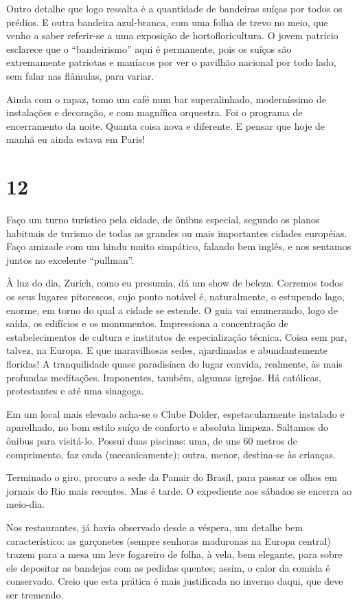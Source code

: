 Outro detalhe que logo ressalta é a quantidade de bandeiras suíças por todos os prédios. E outra bandeira azul-branca, com uma folha de trevo no meio, que venho a saber referir-se a uma exposição de hortofloricultura. O jovem patrício esclarece que o ``bandeirismo'' aqui é permanente, pois os suíços são extremamente patriotas e maníacos por ver o pavilhão nacional por todo lado, sem falar nas flâmulas, para variar.

Ainda com o rapaz, tomo um café num bar superalinhado, moderníssimo de instalações e decoração, e com magnífica orquestra. Foi o programa de encerramento da noite. Quanta coisa nova e diferente. E pensar que hoje de manhã eu ainda estava em Paris!

\section*{12 \adfflatleafright {}}
Faço um turno turístico pela cidade, de ônibus especial, segundo os planos habituais de turismo de todas as grandes ou mais importantes cidades européias. Faço amizade com um hindu muito simpático, falando bem inglês, e nos sentamos juntos no excelente ``pullman''.

À luz do dia, Zurich, como eu presumia, dá um show de beleza. Corremos todos os seus lugares pitorescos, cujo ponto notável é, naturalmente, o estupendo lago, enorme, em torno do qual a cidade se estende. O guia vai enumerando, logo de saída, os edifícios e os monumentos. Impressiona a concentração de estabelecimentos de cultura e institutos de especialização técnica. Coisa sem par, talvez, na Europa. E que maravilhosas sedes, ajardinadas e abundantemente floridas! A tranquilidade quase paradisíaca do lugar convida, realmente, às mais profundas meditações. Imponentes, também, algumas igrejas. Há católicas, protestantes e até uma sinagoga.

Em um local mais elevado acha-se o Clube Dolder, espetacularmente instalado e aparelhado, no bom estilo suíço de conforto e absoluta limpeza. Saltamos do ônibus para visitá-lo. Possui duas piscinas: uma, de uns 60 metros de comprimento, faz onda (mecanicamente); outra, menor, destina-se às crianças.

Terminado o giro, procuro a sede da Panair do Brasil, para passar os olhos em jornais do Rio mais recentes. Mas é tarde. O expediente aos sábados se encerra ao meio-dia.

Nos restaurantes, já havia observado desde a véspera, um detalhe bem característico: as garçonetes (sempre senhoras maduronas na Europa central) trazem para a mesa um leve fogareiro de folha, à vela, bem elegante, para sobre ele depositar as bandejas com as pedidas quentes; assim, o calor da comida é conservado. Creio que esta prática é mais justificada no inverno daqui, que deve ser tremendo.

